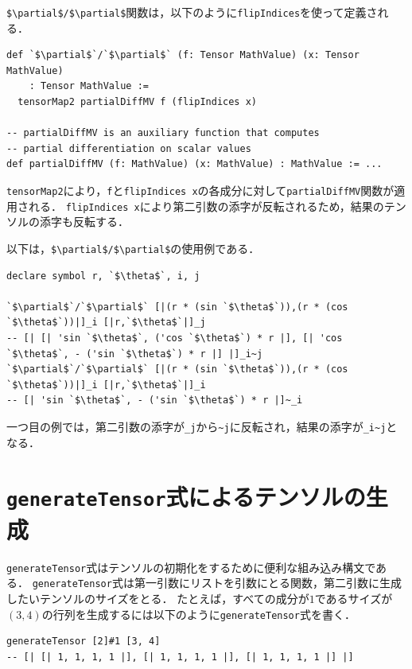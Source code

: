 \lstinline[mathescape]!$\partial$/$\partial$!関数は，以下のように\lstinline{flipIndices}を使って定義される．
\begin{lstlisting}[language=egison,numbers=none]
def `$\partial$`/`$\partial$` (f: Tensor MathValue) (x: Tensor MathValue)
    : Tensor MathValue :=
  tensorMap2 partialDiffMV f (flipIndices x)

-- partialDiffMV is an auxiliary function that computes
-- partial differentiation on scalar values
def partialDiffMV (f: MathValue) (x: MathValue) : MathValue := ...
\end{lstlisting}

\lstinline{tensorMap2}により，\lstinline{f}と\lstinline{flipIndices x}の各成分に対して\lstinline{partialDiffMV}関数が適用される．
\lstinline{flipIndices x}により第二引数の添字が反転されるため，結果のテンソルの添字も反転する．

以下は，\lstinline[mathescape]!$\partial$/$\partial$!の使用例である．
\begin{lstlisting}[language=egison,numbers=none]
declare symbol r, `$\theta$`, i, j

`$\partial$`/`$\partial$` [|(r * (sin `$\theta$`)),(r * (cos `$\theta$`))|]_i [|r,`$\theta$`|]_j
-- [| [| 'sin `$\theta$`, ('cos `$\theta$`) * r |], [| 'cos `$\theta$`, - ('sin `$\theta$`) * r |] |]_i~j
`$\partial$`/`$\partial$` [|(r * (sin `$\theta$`)),(r * (cos `$\theta$`))|]_i [|r,`$\theta$`|]_i
-- [| 'sin `$\theta$`, - ('sin `$\theta$`) * r |]~_i
\end{lstlisting}

一つ目の例では，第二引数の添字が\lstinline{_j}から\lstinline{~j}に反転され，結果の添字が\lstinline{_i~j}となる．

\section{\texttt{generateTensor}式によるテンソルの生成}

\lstinline{generateTensor}式はテンソルの初期化をするために便利な組み込み構文である．
\lstinline{generateTensor}式は第一引数にリストを引数にとる関数，第二引数に生成したいテンソルのサイズをとる．
たとえば，すべての成分が$1$であるサイズが$(3, 4)$の行列を生成するには以下のように\lstinline{generateTensor}式を書く．
\begin{lstlisting}[language=egison,numbers=none]
generateTensor [2]#1 [3, 4]
-- [| [| 1, 1, 1, 1 |], [| 1, 1, 1, 1 |], [| 1, 1, 1, 1 |] |]
\end{lstlisting}

